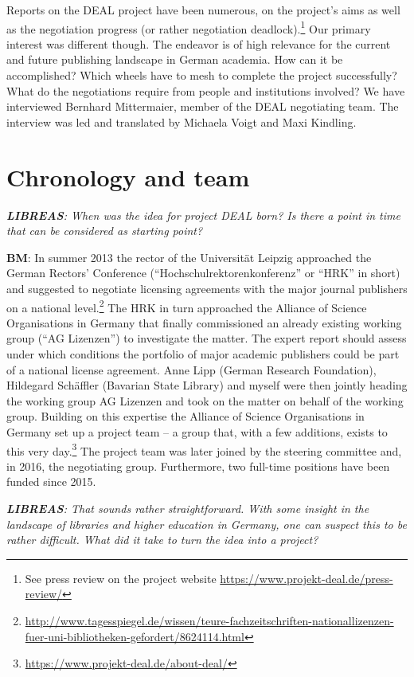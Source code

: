 \documentclass[a4paper,
fontsize=11pt,
oneside,
numbers=noperiodatend,
parskip=half-,
bibliography=totoc,
final
]{scrartcl}
\begin{document}
Reports on the DEAL project have been numerous, on the project's aims as
well as the negotiation progress (or rather negotiation
deadlock).\footnote{See press review on the project website
  \url{https://www.projekt-deal.de/press-review/}} Our primary interest
was different though. The endeavor is of high relevance for the current
and future publishing landscape in German academia. How can it be
accomplished? Which wheels have to mesh to complete the project
successfully? What do the negotiations require from people and
institutions involved? We have interviewed Bernhard Mittermaier, member
of the DEAL negotiating team. The interview was led and translated by
Michaela Voigt and Maxi Kindling.

\hypertarget{chronology-and-team}{%
\section*{Chronology and team}\label{chronology-and-team}}

\emph{\textbf{LIBREAS}: When was the idea for project DEAL born? Is
there a point in time that can be considered as starting point?}

\textbf{BM}: In summer 2013 the rector of the Universität Leipzig
approached the German Rectors' Conference
(\enquote{Hochschulrektorenkonferenz} or \enquote{HRK} in short) and
suggested to negotiate licensing agreements with the major journal
publishers on a national level.\footnote{\url{http://www.tagesspiegel.de/wissen/teure-fachzeitschriften-nationallizenzen-fuer-uni-bibliotheken-gefordert/8624114.html}}
The HRK in turn approached the Alliance of Science Organisations in
Germany that finally commissioned an already existing working group
(\enquote{AG Lizenzen}) to investigate the matter. The expert report
should assess under which conditions the portfolio of major academic
publishers could be part of a national license agreement. Anne Lipp
(German Research Foundation), Hildegard Schäffler (Bavarian State
Library) and myself were then jointly heading the working group AG
Lizenzen and took on the matter on behalf of the working group. Building
on this expertise the Alliance of Science Organisations in Germany set
up a project team -- a group that, with a few additions, exists to this
very day.\footnote{\url{https://www.projekt-deal.de/about-deal/}} The
project team was later joined by the steering committee and, in 2016,
the negotiating group. Furthermore, two full-time positions have been
funded since 2015.

\emph{\textbf{LIBREAS}: That sounds rather straightforward. With some
insight in the landscape of libraries and higher education in Germany,
one can suspect this to be rather difficult. What did it take to turn
the idea into a project?}
\end{document}

